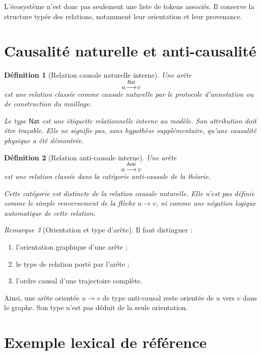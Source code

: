 \documentclass[11pt,a4paper,oneside]{book}
\newtheorem{definition}{Définition}[chapter]
\theoremstyle{remark}
\newtheorem{remarque}[definition]{Remarque}
\newcommand{\Nat}{\mathsf{Nat}}
\newcommand{\Anti}{\mathsf{Anti}}
\begin{document}
L'écosystème n'est donc pas seulement une liste de tokens associés.
Il conserve la structure typée des relations, notamment leur
orientation et leur provenance.

\section{Causalité naturelle et anti-causalité}

\begin{definition}[Relation causale naturelle interne]
Une arête
\[
u\xrightarrow{\Nat}v
\]
est une relation classée comme causale naturelle par le protocole
d'annotation ou de construction du maillage.

Le type \(\Nat\) est une étiquette relationnelle interne au modèle.
Son attribution doit être traçable. Elle ne signifie pas, sans
hypothèse supplémentaire, qu'une causalité physique a été démontrée.
\end{definition}

\begin{definition}[Relation anti-causale interne]
Une arête
\[
u\xrightarrow{\Anti}v
\]
est une relation classée dans la catégorie anti-causale de la théorie.

Cette catégorie est distincte de la relation causale naturelle.
Elle n'est pas définie comme le simple renversement de la flèche
\(u\to v\), ni comme une négation logique automatique de cette
relation.
\end{definition}

\begin{remarque}[Orientation et type d'arête]
Il faut distinguer :

\begin{enumerate}
  \item l'orientation graphique d'une arête ;
  \item le type de relation porté par l'arête ;
  \item l'ordre causal d'une trajectoire complète.
\end{enumerate}

Ainsi, une arête orientée \(u\to v\) de type anti-causal reste
orientée de \(u\) vers \(v\) dans le graphe. Son type n'est pas
déduit de la seule orientation.
\end{remarque}

\section{Exemple lexical de référence}
\end{document}

